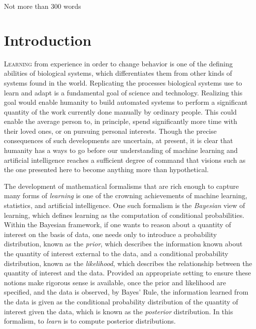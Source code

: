 \documentclass[11pt]{book}
\begin{document}
Not more than 300 words

\tableofcontents





\chapter{Introduction}

\lettrine{L}{earning} from experience in order to change behavior is one of the defining abilities of biological systems, which differentiates them from other kinds of systems found in the world.
Replicating the processes biological systems use to learn and adapt is a fundamental goal of science and technology.
Realizing this goal would enable humanity to build automated systems to perform a significant quantity of the work currently done manually by ordinary people.
This could enable the average person to, in principle, spend significantly more time with their loved ones, or on pursuing personal interests.
Though the precise consequences of such developments are uncertain, at present, it is clear that humanity has a ways to go before our understanding of machine learning and artificial intelligence reaches a sufficient degree of command that visions such as the one presented here to become anything more than hypothetical.

The development of mathematical formalisms that are rich enough to capture many forms of \emph{learning} is one of the crowning achievements of machine learning, statistics, and artificial intelligence.
One such formalism is the \emph{Bayesian} view of learning, which defines learning as the computation of conditional probabilities.
Within the Bayesian framework, if one wants to reason about a quantity of interest on the basis of data, one needs only to introduce a probability distribution, known as the \emph{prior}, which describes the information known about the quantity of interest external to the data, and a conditional probability distribution, known as the \emph{likelihood}, which describes the relationship between the quantity of interest and the data.
Provided an appropriate setting to ensure these notions make rigorous sense is available, once the prior and likelihood are specified, and the data is observed, by Bayes' Rule, the information learned from the data is given as the conditional probability distribution of the quantity of interest given the data, which is known as the \emph{posterior} distribution.
In this formalism, to \emph{learn} is to compute posterior distributions.
\end{document}

